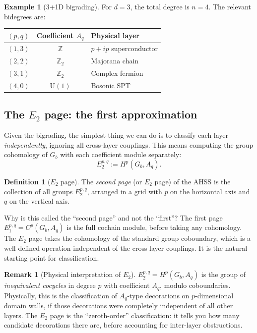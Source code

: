 \documentclass{SciPost}
\theoremstyle{definition}
\newtheorem{definition}[theorem]{Definition}
\newtheorem{example}[theorem]{Example}
\newtheorem{remark}[theorem]{Remark}
\newcommand{\Z}{\mathbb{Z}}
\newcommand{\Zt}{\mathbb{Z}_2}
\newcommand{\U}{\mathrm{U}}
\newcommand{\Gb}{G_b}
\begin{document}
\begin{example}[3+1D bigrading]
For $d = 3$, the total degree is $n = 4$.
The relevant bidegrees are:
\begin{center}
\renewcommand{\arraystretch}{1.3}
\begin{tabular}{ccl}
\toprule
$(p,q)$ & Coefficient $A_q$ & Physical layer \\
\midrule
$(1,3)$ & $\Z$ & $p+ip$ superconductor \\
$(2,2)$ & $\Zt$ & Majorana chain \\
$(3,1)$ & $\Zt$ & Complex fermion \\
$(4,0)$ & $\U(1)$ & Bosonic SPT \\
\bottomrule
\end{tabular}
\end{center}
\end{example}

\subsection{The $E_2$ page: the first approximation}
\label{subsec:E2-page}

Given the bigrading, the simplest thing we can do is to classify each layer \emph{independently}, ignoring all cross-layer couplings.
This means computing the group cohomology of $\Gb$ with each coefficient module separately:
\begin{equation}
\label{eq:E2-page}
E_2^{p,q} := H^p(\Gb, A_q).
\end{equation}

\begin{definition}[$E_2$ page]
The \emph{second page} (or $E_2$ page) of the AHSS is the collection of all groups $E_2^{p,q}$, arranged in a grid with $p$ on the horizontal axis and $q$ on the vertical axis.
\end{definition}

Why is this called the ``second page'' and not the ``first''?
The first page $E_1^{p,q} = C^p(\Gb, A_q)$ is the full cochain module, before taking any cohomology.
The $E_2$ page takes the cohomology of the standard group coboundary, which is a well-defined operation independent of the cross-layer couplings.
It is the natural starting point for classification.

\begin{remark}[Physical interpretation of $E_2$]
\label{rem:E2-physical}
$E_2^{p,q} = H^p(\Gb, A_q)$ is the group of \emph{inequivalent cocycles} in degree $p$ with coefficient $A_q$, modulo coboundaries.
Physically, this is the classification of $A_q$-type decorations on $p$-dimensional domain walls, if those decorations were completely independent of all other layers.
The $E_2$ page is the ``zeroth-order'' classification: it tells you how many candidate decorations there are, before accounting for inter-layer obstructions.
\end{remark}
\end{document}

